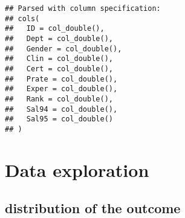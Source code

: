 \documentclass[]{article}
\newenvironment{Shaded}{\begin{snugshade}}{\end{snugshade}}
\newcommand{\CommentTok}[1]{\textcolor[rgb]{0.56,0.35,0.01}{\textit{#1}}}
\newcommand{\DataTypeTok}[1]{\textcolor[rgb]{0.13,0.29,0.53}{#1}}
\newcommand{\KeywordTok}[1]{\textcolor[rgb]{0.13,0.29,0.53}{\textbf{#1}}}
\newcommand{\NormalTok}[1]{#1}
\newcommand{\OperatorTok}[1]{\textcolor[rgb]{0.81,0.36,0.00}{\textbf{#1}}}
\newcommand{\StringTok}[1]{\textcolor[rgb]{0.31,0.60,0.02}{#1}}
\begin{document}
\begin{verbatim}
## Parsed with column specification:
## cols(
##   ID = col_double(),
##   Dept = col_double(),
##   Gender = col_double(),
##   Clin = col_double(),
##   Cert = col_double(),
##   Prate = col_double(),
##   Exper = col_double(),
##   Rank = col_double(),
##   Sal94 = col_double(),
##   Sal95 = col_double()
## )
\end{verbatim}

\begin{Shaded}
\end{Shaded}

\hypertarget{data-exploration}{%
\section{Data exploration}\label{data-exploration}}

\hypertarget{distribution-of-the-outcome}{%
\subsection{distribution of the
outcome}\label{distribution-of-the-outcome}}
\end{document}
